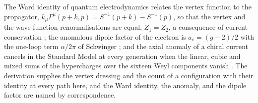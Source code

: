 \begin{chbridge}
The Ward identity of quantum electrodynamics relates the vertex function to the propagator, $k_\mu \Gamma^\mu(p+k, p) = S^{-1}(p+k) - S^{-1}(p)$, so that the vertex and the wave-function renormalisations are equal, $Z_1 = Z_2$, a consequence of current conservation \cite{Ward1950,Takahashi1957}; the anomalous dipole factor of the electron is $a_e = (g-2)/2$ with the one-loop term $\alpha/2\pi$ of Schwinger \cite{Schwinger1949}; and the axial anomaly of a chiral current cancels in the Standard Model at every generation when the linear, cubic and mixed sums of the hypercharges over the sixteen Weyl components vanish \cite{Adler1969,BellJackiw1969,Bouchiat1972}. The derivation supplies the vertex dressing and the count of a configuration with their identity at every path here, and the Ward identity, the anomaly, and the dipole factor are named by correspondence.
\end{chbridge}
